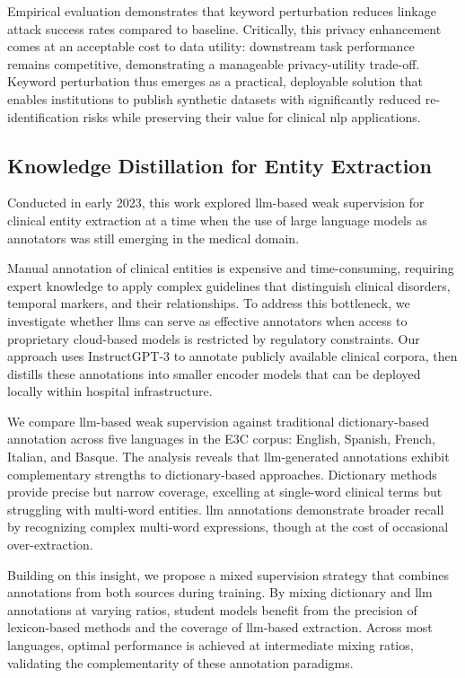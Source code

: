 Empirical evaluation demonstrates that keyword perturbation reduces linkage attack success rates compared to baseline.
Critically, this privacy enhancement comes at an acceptable cost to data utility: downstream task performance remains competitive, demonstrating a manageable privacy-utility trade-off.
Keyword perturbation thus emerges as a practical, deployable solution that enables institutions to publish synthetic datasets with significantly reduced re-identification risks while preserving their value for clinical \gls{nlp} applications.

\subsection{Knowledge Distillation for Entity Extraction}

Conducted in early 2023, this work explored \gls{llm}-based weak supervision for clinical entity extraction at a time when the use of large language models as annotators was still emerging in the medical domain.

Manual annotation of clinical entities is expensive and time-consuming, requiring expert knowledge to apply complex guidelines that distinguish clinical disorders, temporal markers, and their relationships.
To address this bottleneck, we investigate whether \glspl{llm} can serve as effective annotators when access to proprietary cloud-based models is restricted by regulatory constraints.
Our approach uses InstructGPT-3 to annotate publicly available clinical corpora, then distills these annotations into smaller encoder models that can be deployed locally within hospital infrastructure.

We compare \gls{llm}-based weak supervision against traditional dictionary-based annotation across five languages in the E3C corpus: English, Spanish, French, Italian, and Basque.
The analysis reveals that \gls{llm}-generated annotations exhibit complementary strengths to dictionary-based approaches.
Dictionary methods provide precise but narrow coverage, excelling at single-word clinical terms but struggling with multi-word entities.
\gls{llm} annotations demonstrate broader recall by recognizing complex multi-word expressions, though at the cost of occasional over-extraction.

Building on this insight, we propose a mixed supervision strategy that combines annotations from both sources during training.
By mixing dictionary and \gls{llm} annotations at varying ratios, student models benefit from the precision of lexicon-based methods and the coverage of \gls{llm}-based extraction.
Across most languages, optimal performance is achieved at intermediate mixing ratios, validating the complementarity of these annotation paradigms.

